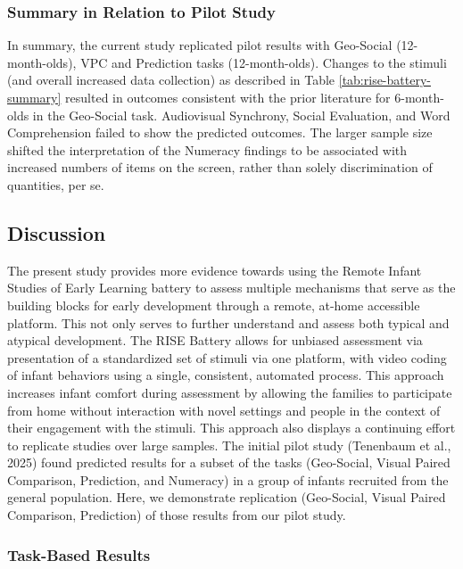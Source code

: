 \documentclass[
  english,
  man,floatsintext]{apa6}
\begin{document}
\subsubsection{Summary in Relation to Pilot Study}\label{summary-in-relation-to-pilot-study}

In summary, the current study replicated pilot results with Geo-Social (12-month-olds), VPC and Prediction tasks (12-month-olds).
Changes to the stimuli (and overall increased data collection) as described in Table \ref{tab:rise-battery-summary} resulted in outcomes consistent with the prior literature for 6-month-olds in the Geo-Social task.
Audiovisual Synchrony, Social Evaluation, and Word Comprehension failed to show the predicted outcomes.
The larger sample size shifted the interpretation of the Numeracy findings to be associated with increased numbers of items on the screen, rather than solely discrimination of quantities, per se.

\subsection{Discussion}\label{discussion}

The present study provides more evidence towards using the Remote Infant Studies of Early Learning battery to assess multiple mechanisms that serve as the building blocks for early development through a remote, at-home accessible platform.
This not only serves to further understand and assess both typical and atypical development.
The RISE Battery allows for unbiased assessment via presentation of a standardized set of stimuli via one platform, with video coding of infant behaviors using a single, consistent, automated process.
This approach increases infant comfort during assessment by allowing the families to participate from home without interaction with novel settings and people in the context of their engagement with the stimuli.
This approach also displays a continuing effort to replicate studies over large samples.
The initial pilot study (Tenenbaum et al., 2025) found predicted results for a subset of the tasks (Geo-Social, Visual Paired Comparison, Prediction, and Numeracy) in a group of infants recruited from the general population.
Here, we demonstrate replication (Geo-Social, Visual Paired Comparison, Prediction) of those results from our pilot study.

\subsubsection{Task-Based Results}\label{task-based-results}
\end{document}
